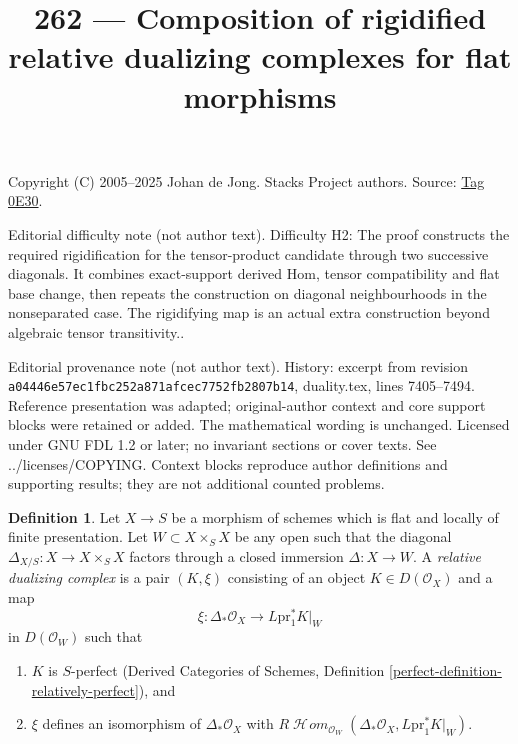 \documentclass{amsart}
\theoremstyle{plain}
\theoremstyle{definition}
\newtheorem{definition}[subsection]{Definition}
\theoremstyle{remark}
\numberwithin{equation}{subsection}
\def\SheafHom{\mathop{\mathcal{H}\!\mathit{om}}\nolimits}
\begin{document}
\title[Stacks Project, Tag 0E30]{262 --- Composition of rigidified relative dualizing complexes for flat morphisms}
\maketitle
\noindent Copyright (C) 2005--2025 Johan de Jong. Stacks Project authors. Source: \href{https://stacks.math.columbia.edu/tag/0E30}{Tag 0E30}.

\noindent Editorial difficulty note (not author text). Difficulty H2: The proof constructs the required rigidification for the tensor-product candidate through two successive diagonals. It combines exact-support derived Hom, tensor compatibility and flat base change, then repeats the construction on diagonal neighbourhoods in the nonseparated case. The rigidifying map is an actual extra construction beyond algebraic tensor transitivity..

\noindent Editorial provenance note (not author text). History: excerpt from revision \texttt{a0444\allowbreak 6e57e\allowbreak c1fbc\allowbreak 252a8\allowbreak 71afc\allowbreak ec775\allowbreak 2fb28\allowbreak 07b14}, duality.tex, lines 7405--7494. Reference presentation was adapted; original-author context and core support blocks were retained or added. The mathematical wording is unchanged. Licensed under GNU FDL 1.2 or later; no invariant sections or cover texts. See ../licenses/COPYING. Context blocks reproduce author definitions and supporting results; they are not additional counted problems.

\begin{definition}
\label{definition-relative-dualizing-complex}
Let $X \to S$ be a morphism of schemes which is flat and
locally of finite presentation. Let $W \subset X \times_S X$
be any open such that the diagonal $\Delta_{X/S} : X \to X \times_S X$
factors through a closed immersion $\Delta : X \to W$.
A {\it relative dualizing complex} is a
pair $(K, \xi)$ consisting of an object $K \in D(\mathcal{O}_X)$
and a map
$$
\xi : \Delta_*\mathcal{O}_X \longrightarrow L\text{pr}_1^*K|_W
$$
in $D(\mathcal{O}_W)$ such that
\begin{enumerate}
\item $K$ is $S$-perfect (Derived Categories of Schemes, Definition
\ref{perfect-definition-relatively-perfect}), and
\item $\xi$ defines an isomorphism of $\Delta_*\mathcal{O}_X$
with
$R\SheafHom_{\mathcal{O}_W}(
\Delta_*\mathcal{O}_X, L\text{pr}_1^*K|_W)$.
\end{enumerate}
\end{definition}
\end{document}
